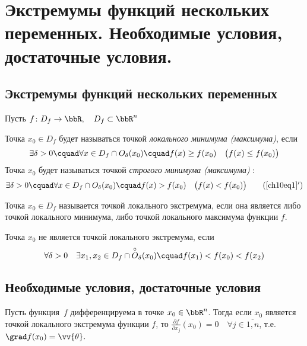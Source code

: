 \chapter{Экстремумы функций нескольких переменных. Необходимые условия, достаточные условия.}

\section{Экстремумы функций нескольких переменных}

Пусть $f\colon D_f \to \bbR, \quad D_f \subset \bbR^n$

\begin{defn}
Точка $x_0 \in D_f$ будет называться точкой \textit{локального минимума (максимума)}, если 
\begin{equation} \label{ch10eq1}
\exists \delta > 0 \cquad \forall x \in D_f \cap O_\delta(x_0) \cquad f(x) \ge f(x_0)\quad \bigl(f(x) \le f(x_0)\bigr)
\end{equation} 
Точка $x_0$ будет называться точкой \textit{строгого минимума (максимума)} :
\begin{equation}\label{ch10eq1'}
\exists \delta > 0\cquad \forall x \in D_f \cap O_\delta(x_0) \cquad f(x) > f(x_0)\quad \bigl(f(x) < f(x_0)\bigr)
\tag{\ref{ch10eq1}$'$} 
\end{equation} 
\end{defn}

\begin{defn}
Точка $x_0 \in D_f$ называется точкой локального экстремума, если она является либо точкой локального минимума, либо точкой локального максимума функции $f$.

Точка $x_0$ не является точкой локального экстремума, если
$$\forall \delta > 0 \quad \exists x_1, x_2 \in D_f \cap \overset{\circ}{O}_\delta(x_0) \cquad f(x_1) < f(x_0) < f(x_2)$$
\end{defn}
\section{Необходимые условия, достаточные условия}

\begin{thm} \label{ch10thm1}
Пусть функция~$f$ дифференцируема в точке $x_0 \in \bbR^n$. Тогда если $x_0$ является точкой локального экстремума функции $f$, то $\frac{\partial f}{\partial x_j}(x_0) = 0 \quad \forall j \in \overline{1,n}$, т.е.~$\grad f(x_0) = \vv{\theta}.$
\end{thm}

